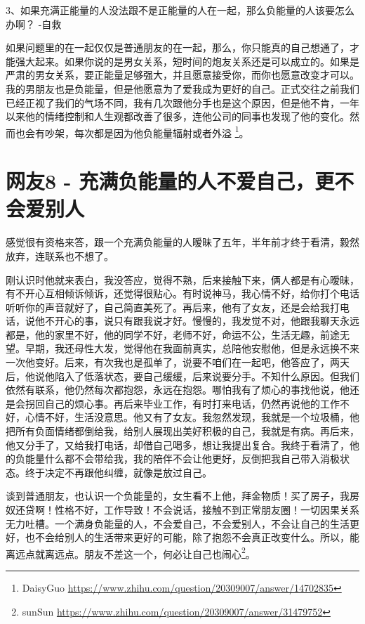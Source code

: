 3、如果充满正能量的人没法跟不是正能量的人在一起，那么负能量的人该要怎么办啊？ -自救

如果问题里的在一起仅仅是普通朋友的在一起，那么，你只能真的自己想通了，才能强大起来。如果你说的是男女关系，短时间的炮友关系还是可以成立的。如果是严肃的男女关系，要正能量足够强大，并且愿意接受你，而你也愿意改变才可以。我的男朋友也是负能量，但是他愿意为了爱我成为更好的自己。正式交往之前我们已经正视了我们的气场不同，我有几次跟他分手也是这个原因，但是他不肯，一年以来他的情绪控制和人生观都改善了很多，连他公司的同事也发现了他的变化。然而也会有吵架，每次都是因为他负能量辐射或者外溢
\footnote{DaisyGuo \quad \url{https://www.zhihu.com/question/20309007/answer/14702835}}。

\section{网友8 - 充满负能量的人不爱自己，更不会爱别人}

感觉很有资格来答，跟一个充满负能量的人暧昧了五年，半年前才终于看清，毅然放弃，连联系也不想了。

刚认识时他就来表白，我没答应，觉得不熟，后来接触下来，俩人都是有心暧昧，有不开心互相倾诉倾诉，还觉得很贴心。有时说神马，我心情不好，给你打个电话听听你的声音就好了，自己简直美死了。再后来，他有了女友，还是会给我打电话，说他不开心的事，说只有跟我说才好。慢慢的，我发觉不对，他跟我聊天永远都是，他的家里不好，他的同学不好，老师不好，命运不公，生活无趣，前途无望。早期，我还母性大发，觉得他在我面前真实，总陪他安慰他，但是永远换不来一次他变好。后来，有次我也是孤单了，说要不咱们在一起吧，他答应了，两天后，他说他陷入了低落状态，要自己缓缓，后来说要分手。不知什么原因。但我们依然有联系，他仍然每次都抱怨，永远在抱怨。哪怕我有了烦心的事找他说，他还是会拐回自己的烦心事。再后来毕业工作，有时打来电话，仍然再说他的工作不好，心情不好，生活没意思。他又有了女友。我忽然发现，我就是一个垃圾桶，他把所有负面情绪都倒给我，给别人展现出美好积极的自己，我就是有病。再后来，他又分手了，又给我打电话，却借自己喝多，想让我提出复合。我终于看清了，他的负能量什么都不会带给我，我的陪伴不会让他更好，反倒把我自己带入消极状态。终于决定不再跟他纠缠，就像是放过自己。

谈到普通朋友，也认识一个负能量的，女生看不上他，拜金物质！买了房子，我房奴还贷啊！性格不好，工作导致！不会说话，接触不到正常朋友圈！一切因果关系无力吐槽。一个满身负能量的人，不会爱自己，不会爱别人，不会让自己的生活更好，也不会给别人的生活带来更好的可能，除了抱怨不会真正改变什么。所以，能离远点就离远点。朋友不差这一个，何必让自己也闹心\footnote{sunSun \quad \url{https://www.zhihu.com/question/20309007/answer/31479752}}。

